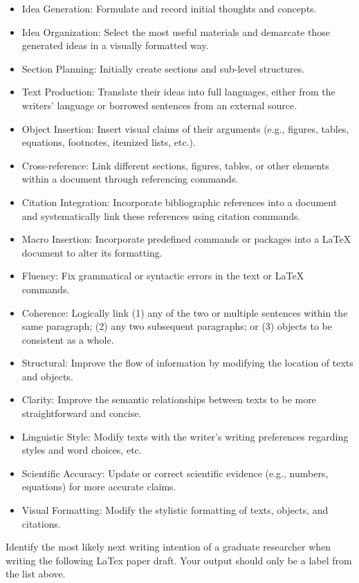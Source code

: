\begin{itemize}
    \item Idea Generation: Formulate and record initial thoughts and concepts.
    \item Idea Organization: Select the most useful materials and demarcate those generated ideas in a visually formatted way.
    \item Section Planning: Initially create sections and sub-level structures.
    \item Text Production: Translate their ideas into full languages, either from the writers' language or borrowed sentences from an external source. 
    \item Object Insertion: Insert visual claims of their arguments (e.g., figures, tables, equations, footnotes, itemized lists, etc.). 
    \item Cross-reference: Link different sections, figures, tables, or other elements within a document through referencing commands. 
    \item Citation Integration: Incorporate bibliographic references into a document and systematically link these references using citation commands. 
    \item Macro Insertion: Incorporate predefined commands or packages into a LaTeX document to alter its formatting. 
    \item Fluency: Fix grammatical or syntactic errors in the text or LaTeX commands.
    \item Coherence: Logically link (1) any of the two or multiple sentences within the same paragraph; (2) any two subsequent paragraphs; or (3) objects to be consistent as a whole. 
    \item Structural: Improve the flow of information by modifying the location of texts and objects. 
    \item Clarity: Improve the semantic relationships between texts to be more straightforward and concise. 
    \item Linguistic Style: Modify texts with the writer's writing preferences regarding styles and word choices, etc. 
    \item Scientific Accuracy: Update or correct scientific evidence (e.g., numbers, equations) for more accurate claims. 
    \item Visual Formatting: Modify the stylistic formatting of texts, objects, and citations.
\end{itemize}

Identify the most likely next writing intention of a graduate researcher when writing the following LaTex paper draft. Your output should only be a label from the list above.

